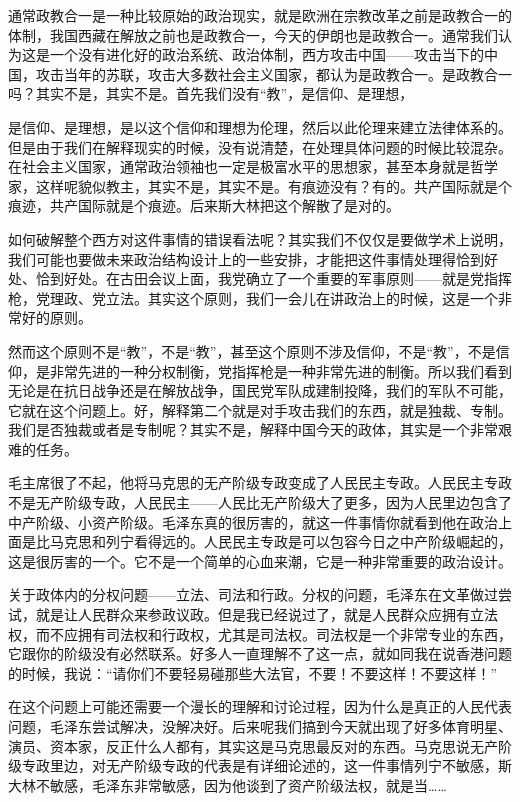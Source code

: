 \documentclass[UTF8, 12pt, a4paper]{ctexrep}
\begin{document}
通常政教合一是一种比较原始的政治现实，就是欧洲在宗教改革之前是政教合一的体制，我国西藏在解放之前也是政教合一，今天的伊朗也是政教合一。通常我们认为这是一个没有进化好的政治系统、政治体制，西方攻击中国——攻击当下的中国，攻击当年的苏联，攻击大多数社会主义国家，都认为是政教合一。是政教合一吗？其实不是，其实不是。首先我们没有“教”，是信仰、是理想，

是信仰、是理想，是以这个信仰和理想为伦理，然后以此伦理来建立法律体系的。但是由于我们在解释现实的时候，没有说清楚，在处理具体问题的时候比较混杂。在社会主义国家，通常政治领袖也一定是极富水平的思想家，甚至本身就是哲学家，这样呢貌似教主，其实不是，其实不是。有痕迹没有？有的。共产国际就是个痕迹，共产国际就是个痕迹。后来斯大林把这个解散了是对的。

如何破解整个西方对这件事情的错误看法呢？其实我们不仅仅是要做学术上说明，我们可能也要做未来政治结构设计上的一些安排，才能把这件事情处理得恰到好处、恰到好处。在古田会议上面，我党确立了一个重要的军事原则——就是党指挥枪，党理政、党立法。其实这个原则，我们一会儿在讲政治上的时候，这是一个非常好的原则。

然而这个原则不是“教”，不是“教”，甚至这个原则不涉及信仰，不是“教”，不是信仰，是非常先进的一种分权制衡，党指挥枪是一种非常先进的制衡。所以我们看到无论是在抗日战争还是在解放战争，国民党军队成建制投降，我们的军队不可能，它就在这个问题上。好，解释第二个就是对手攻击我们的东西，就是独裁、专制。我们是否独裁或者是专制呢？其实不是，解释中国今天的政体，其实是一个非常艰难的任务。

毛主席很了不起，他将马克思的无产阶级专政变成了人民民主专政。人民民主专政不是无产阶级专政，人民民主——人民比无产阶级大了更多，因为人民里边包含了中产阶级、小资产阶级。毛泽东真的很厉害的，就这一件事情你就看到他在政治上面是比马克思和列宁看得远的。人民民主专政是可以包容今日之中产阶级崛起的，这是很厉害的一个。它不是一个简单的心血来潮，它是一种非常重要的政治设计。

关于政体内的分权问题——立法、司法和行政。分权的问题，毛泽东在文革做过尝试，就是让人民群众来参政议政。但是我已经说过了，就是人民群众应拥有立法权，而不应拥有司法权和行政权，尤其是司法权。司法权是一个非常专业的东西，它跟你的阶级没有必然联系。好多人一直理解不了这一点，就如同我在说香港问题的时候，我说：“请你们不要轻易碰那些大法官，不要！不要这样！不要这样！”

在这个问题上可能还需要一个漫长的理解和讨论过程，因为什么是真正的人民代表问题，毛泽东尝试解决，没解决好。后来呢我们搞到今天就出现了好多体育明星、演员、资本家，反正什么人都有，其实这是马克思最反对的东西。马克思说无产阶级专政里边，对无产阶级专政的代表是有详细论述的，这一件事情列宁不敏感，斯大林不敏感，毛泽东非常敏感，因为他谈到了资产阶级法权，就是当……
\end{document}
